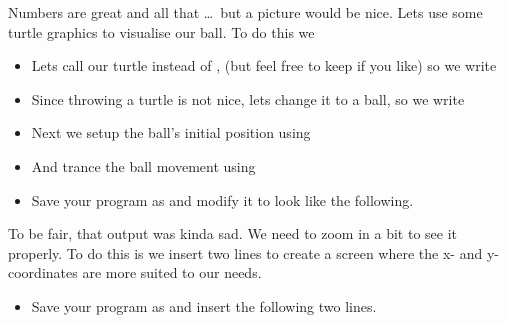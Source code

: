 \documentclass{coderdojo}
\newcommand\TODO[1]{
\begin{itemize}
\item[\todoSymbol] \color{todo} #1
\end{itemize}}
\begin{document}
Numbers are great and all that \ldots\ but a picture would be nice.  Lets use some turtle graphics to visualise our ball. To do this we 
\begin{itemize}
\item Lets call our turtle  instead of , (but feel free to keep  if you like) so we write


\item Since throwing a turtle is not nice, lets change it to a ball, so we write


\item Next we setup the ball's initial position using


\item And trance the ball movement using 


\end{itemize}

\TODO{Save your  program as  and modify it to look like the following.}


To be fair, that output was kinda sad. We need to zoom in a bit to see it properly. To do this is we insert two lines to create a screen where the x- and y- coordinates are more suited to our needs.

\TODO{Save your  program as  and insert the following two lines.}

\end{document}
